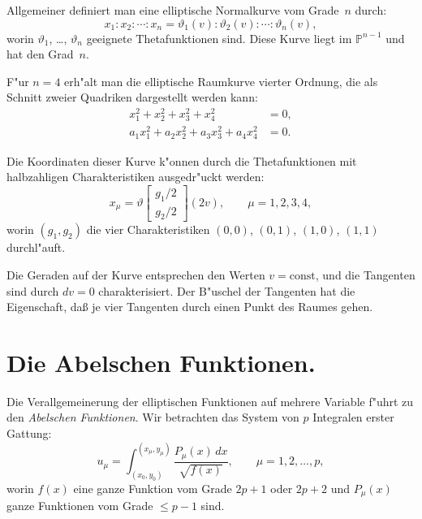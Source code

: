 \documentclass[12pt,a4paper]{article}
\theoremstyle{definition}
\begin{document}
Allgemeiner definiert man eine elliptische Normalkurve vom Grade~$n$ durch:
\begin{equation}\tag{3}
x_1 : x_2 : \cdots : x_n = \vartheta_1(v) : \vartheta_2(v) : \cdots : \vartheta_n(v),
\end{equation}
worin $\vartheta_1$, \ldots, $\vartheta_n$ geeignete Thetafunktionen sind. Diese Kurve liegt im $\mathbb{P}^{n-1}$ und hat den Grad~$n$.

F"ur $n = 4$ erh"alt man die elliptische Raumkurve vierter Ordnung, die als Schnitt zweier Quadriken dargestellt werden kann:
\begin{align*}
x_1^2 + x_2^2 + x_3^2 + x_4^2 &= 0,\\
a_1x_1^2 + a_2x_2^2 + a_3x_3^2 + a_4x_4^2 &= 0.
\end{align*}

\newpage

Die Koordinaten dieser Kurve k"onnen durch die Thetafunktionen mit halbzahligen Charakteristiken ausgedr"uckt werden:
\begin{equation}\tag{4}
x_\mu = \vartheta\!\left[\begin{array}{c} g_1/2 \\ g_2/2 \end{array}\right](2v),\qquad \mu = 1,2,3,4,
\end{equation}
worin $(g_1, g_2)$ die vier Charakteristiken $(0,0)$, $(0,1)$, $(1,0)$, $(1,1)$ durchl"auft.

Die Geraden auf der Kurve entsprechen den Werten $v = \text{const}$, und die Tangenten sind durch $dv = 0$ charakterisiert. Der B"uschel der Tangenten hat die Eigenschaft, da\ss{}{} je vier Tangenten durch einen Punkt des Raumes gehen.

\section{Die Abelschen Funktionen.}

Die Verallgemeinerung der elliptischen Funktionen auf mehrere Variable f"uhrt zu den \emph{Abelschen Funktionen}. Wir betrachten das System von $p$ Integralen erster Gattung:
\begin{equation}\tag{1}
u_\mu = \int_{(x_0,y_0)}^{(x_\mu,y_\mu)} \frac{P_\mu(x)\,dx}{\sqrt{f(x)}},\qquad \mu = 1,2,\ldots,p,
\end{equation}
worin $f(x)$ eine ganze Funktion vom Grade $2p+1$ oder $2p+2$ und $P_\mu(x)$ ganze Funktionen vom Grade $\leq p-1$ sind.

\newpage
\end{document}
